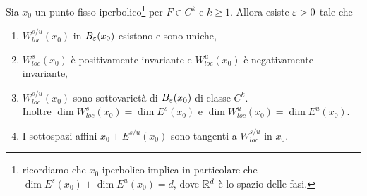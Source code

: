 \begin{theorem}\label{TeoremaVarietaStabileInstabile}
Sia $x_0$ un punto fisso iperbolico\footnote{ricordiamo che $x_0$ iperbolico implica in particolare che $\dim E^s(x_0)+\dim E^u(x_0)=d$, dove $\mathbb{R}^d$ \`e lo spazio delle fasi.} per $F\in C^k$ e $k\geq 1$. Allora esiste $\varepsilon>0$ tale che
\setlength{\leftmargini}{0.5cm}
\begin{enumerate}
\item $W_{loc}^{s/u}(x_0)$ in $B_\varepsilon(x_0)$ esistono e sono uniche,
\item $W^s_{loc}(x_0)$ \`e positivamente invariante e $W^u_{loc}(x_0)$ \`e negativamente invariante,
\item $W^{s/u}_{loc}(x_0)$ sono sottovariet\`a di $B_\varepsilon(x_0)$ di classe $C^k$.\\
Inoltre $\dim W^s_{loc}(x_0)=\dim E^s(x_0)$ e $\dim W^u_{loc}(x_0)=\dim E^u(x_0)$.
\item I sottospazi affini $x_0+E^{s/u}(x_0)$ sono tangenti a $W^{s/u}_{loc}$ in $x_0$.
\end{enumerate}
\end{theorem}
